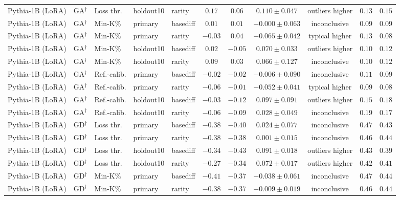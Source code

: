 \begin{table}[t]
\begin{tabular*}{\textwidth}{@{\extracolsep{\fill}}lllllcccccc@{}}
Pythia-1B (LoRA) & GA$^{\dagger}$ & Loss thr. & holdout10 & rarity & $0.17$ & $0.06$ & $0.110 \pm 0.047$ & outliers higher & $0.13$ & $0.15$ \\
Pythia-1B (LoRA) & GA$^{\dagger}$ & Min-K\% & primary & basediff & $0.01$ & $0.01$ & $-0.000 \pm 0.063$ & inconclusive & $0.09$ & $0.09$ \\
Pythia-1B (LoRA) & GA$^{\dagger}$ & Min-K\% & primary & rarity & $-0.03$ & $0.04$ & $-0.065 \pm 0.042$ & typical higher & $0.13$ & $0.08$ \\
Pythia-1B (LoRA) & GA$^{\dagger}$ & Min-K\% & holdout10 & basediff & $0.02$ & $-0.05$ & $0.070 \pm 0.033$ & outliers higher & $0.10$ & $0.12$ \\
Pythia-1B (LoRA) & GA$^{\dagger}$ & Min-K\% & holdout10 & rarity & $0.09$ & $0.03$ & $0.066 \pm 0.127$ & inconclusive & $0.10$ & $0.12$ \\
Pythia-1B (LoRA) & GA$^{\dagger}$ & Ref.-calib. & primary & basediff & $-0.02$ & $-0.02$ & $-0.006 \pm 0.090$ & inconclusive & $0.11$ & $0.09$ \\
Pythia-1B (LoRA) & GA$^{\dagger}$ & Ref.-calib. & primary & rarity & $-0.06$ & $-0.01$ & $-0.052 \pm 0.041$ & typical higher & $0.09$ & $0.08$ \\
Pythia-1B (LoRA) & GA$^{\dagger}$ & Ref.-calib. & holdout10 & basediff & $-0.03$ & $-0.12$ & $0.097 \pm 0.091$ & outliers higher & $0.15$ & $0.18$ \\
Pythia-1B (LoRA) & GA$^{\dagger}$ & Ref.-calib. & holdout10 & rarity & $-0.06$ & $-0.09$ & $0.028 \pm 0.049$ & inconclusive & $0.19$ & $0.17$ \\
Pythia-1B (LoRA) & GD$^{\dagger}$ & Loss thr. & primary & basediff & $-0.38$ & $-0.40$ & $0.024 \pm 0.077$ & inconclusive & $0.47$ & $0.43$ \\
Pythia-1B (LoRA) & GD$^{\dagger}$ & Loss thr. & primary & rarity & $-0.38$ & $-0.38$ & $0.001 \pm 0.015$ & inconclusive & $0.46$ & $0.44$ \\
Pythia-1B (LoRA) & GD$^{\dagger}$ & Loss thr. & holdout10 & basediff & $-0.34$ & $-0.43$ & $0.091 \pm 0.018$ & outliers higher & $0.43$ & $0.39$ \\
Pythia-1B (LoRA) & GD$^{\dagger}$ & Loss thr. & holdout10 & rarity & $-0.27$ & $-0.34$ & $0.072 \pm 0.017$ & outliers higher & $0.42$ & $0.41$ \\
Pythia-1B (LoRA) & GD$^{\dagger}$ & Min-K\% & primary & basediff & $-0.41$ & $-0.37$ & $-0.038 \pm 0.061$ & inconclusive & $0.47$ & $0.44$ \\
Pythia-1B (LoRA) & GD$^{\dagger}$ & Min-K\% & primary & rarity & $-0.38$ & $-0.37$ & $-0.009 \pm 0.019$ & inconclusive & $0.46$ & $0.44$ \\

\end{tabular*}
\end{table}
